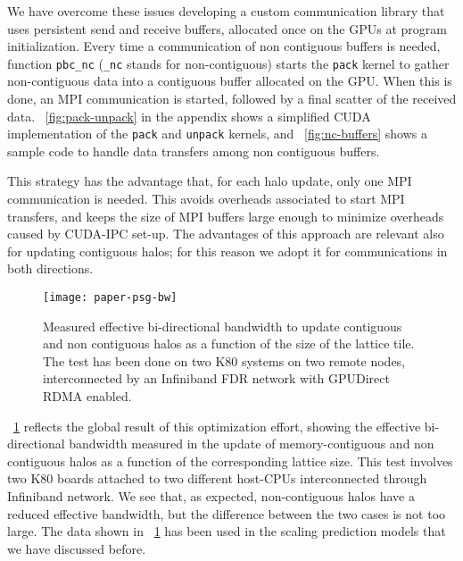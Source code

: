 \documentclass{elsarticle}
\begin{document}
We have overcome these issues developing a custom communication library 
that uses persistent send and receive buffers, allocated once on the GPUs 
at program initialization. 
%
Every time a communication of non contiguous buffers is needed, function {\tt pbc\_nc}
({\tt \_nc} stands for non-contiguous) starts the {\tt pack} kernel 
to gather non-contiguous data into a contiguous buffer allocated on the GPU.
%
When this is done, an MPI communication is started, followed by a final 
scatter of the received data.
%
\figurename~\ref{fig:pack-unpack} in the appendix shows a simplified CUDA 
implementation of the {\tt pack} and {\tt unpack} kernels, and 
\figurename~\ref{fig:nc-buffers} shows a sample code to handle 
data transfers among non contiguous buffers. 

This strategy has the advantage that, for each halo update, only one MPI 
communication is needed. 
%
This avoids overheads associated to start MPI transfers, and  keeps the size 
of MPI buffers large enough to minimize overheads caused by CUDA-IPC set-up. 
%
The advantages of this approach are relevant also for updating contiguous halos; 
for this reason we adopt it for communications in both directions. 

\begin{figure}[t]
\centering
\texttt{[image: paper-psg-bw]}
\caption{
\label{fig:psg-bw}
Measured effective bi-directional bandwidth to update 
contiguous and non contiguous halos as a function of the 
size of the lattice tile. The test has been done on two K80 
systems on two remote nodes, interconnected by an Infiniband 
FDR network with GPUDirect RDMA enabled.
}
\end{figure}
%

\figurename~\ref{fig:psg-bw} reflects the global result of this optimization 
effort, showing the effective bi-directional bandwidth measured in the update 
of memory-contiguous and non contiguous halos as a function of the corresponding 
lattice size. 
%
This test involves two K80 boards attached to two different host-CPUs 
interconnected through Infiniband network.
%
We see that, as expected, non-contiguous halos have a reduced effective 
bandwidth, but the difference between the two cases is not too large. 
%
The data shown in \figurename~\ref{fig:psg-bw} has been used in the 
scaling prediction models that we have discussed before.
\end{document}
